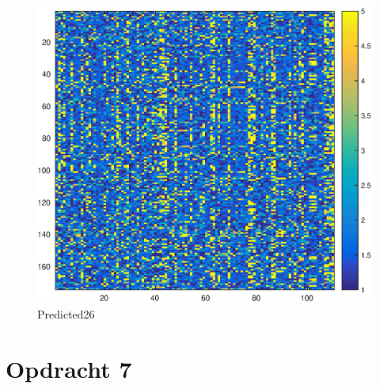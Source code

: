 \documentclass[11pt,a4paper]{article}
\begin{document}
\begin{figure}[H]
\centering
\includegraphics[scale=0.55]{opdracht6}
\caption{Predicted26}
\end{figure}



\section*{Opdracht 7}


\end{document}
